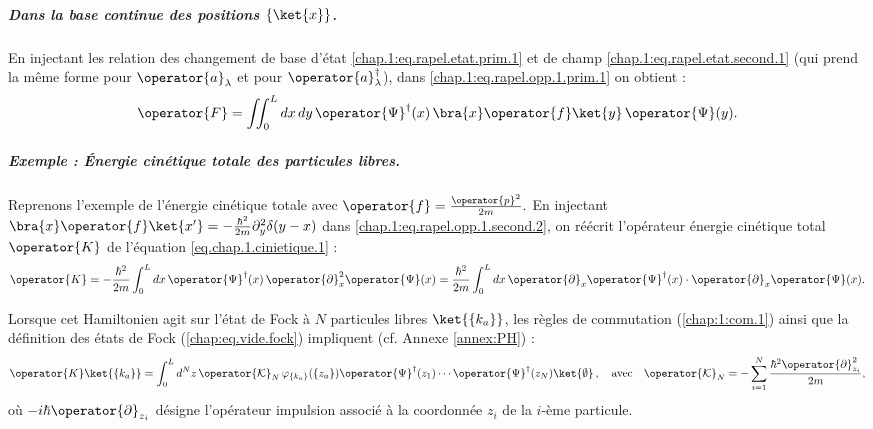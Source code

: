 \subparagraph{Dans la base continue des positions \( \{ \ket{x} \} \).}
En injectant les relation des changement de base d'état
\eqref{chap.1:eq.rapel.etat.prim.1} et de champ \eqref{chap.1:eq.rapel.etat.second.1} (qui prend la même forme pour $\operator{a}_\lambda^{}$ et pour $\operator{a}_\lambda^\dagger$), dans \eqref{chap.1:eq.rapel.opp.1.prim.1} on obtient :
\begin{eqnarray}\label{chap.1:eq.rapel.opp.1.second.2}
\operator{F} = \iint_0^L dx \, dy \, \operator{\Psi}^\dagger(x) \, \bra{ x} \operator{f} \ket{y} \, \operator{\Psi}(y).
\end{eqnarray}%
\begin{mdframed}[
	linewidth=0.5pt, 
	backgroundcolor=gray!5, 
	roundcorner=50pt,	
	innerleftmargin=5pt,
    innerrightmargin=5pt,
    innertopmargin=-10pt,
    innerbottommargin=2pt,
    leftmargin=2pt,
    rightmargin=2pt
]

\subparagraph{Exemple : Énergie cinétique totale des particules libres.}

Reprenons l’exemple de l’énergie cinétique totale avec  
\(
	\operator{f} = \frac{\operator{p}^2}{2m}.
\) 
En injectant 
\(
	\bra{x} \operator{f} \ket{x'} = - \frac{\hbar^2}{2m} \partial_{y}^2 \delta ( y - x )
\) 
dans \eqref{chap.1:eq.rapel.opp.1.second.2}, on réécrit l’opérateur énergie cinétique total $\operator{K}$ de l’équation \eqref{eq.chap.1.cinietique.1} :
\begin{eqnarray}
\operator{K} =  -\frac{\hbar^2}{2m} \int_0^L dx \, \operator{\Psi}^\dagger(x) \, \operator{\partial}_x^2 \operator{\Psi}(x)
= \frac{\hbar^2}{2m} \int_0^L dx \, \operator{\partial}_x \operator{\Psi}^\dagger(x) \cdot \operator{\partial}_x \operator{\Psi}(x). \label{eq.chap.1.cinietique.3}
\end{eqnarray}

Lorsque cet Hamiltonien agit sur l’état de Fock à $N$ particules libres $\ket{\{k_a\}}$, les règles de commutation (\ref{chap:1:com.1}) ainsi que la définition des états de Fock (\ref{chap:eq.vide.fock}) impliquent (cf. Annexe \ref{annex:PH}) :
\begin{eqnarray}\label{eq.chap.1.cinietique.4}
\operator{K}\ket{ \{k_a\}} =  \int_0^L d^N z \, \operator{\mathcal{K}}_N \, \varphi_{\{k_a\}}(\{z_a\} ) \operator{\Psi}^\dag(z_1) \cdots \operator{\Psi}^\dag(z_N) \ket{\emptyset}\, , \quad \mbox{avec} \quad \operator{\mathcal{K}}_N = -\sum_{i=1}^N \frac{\hbar^2\operator{\partial}_{z_i}^2}{2m}, 
\end{eqnarray}
où \( -i \hbar \operator{\partial}_{z_i} \)  désigne l’opérateur impulsion associé à la coordonnée \( z_i \) de la $i$-ème particule.

\medskip



\end{mdframed}


